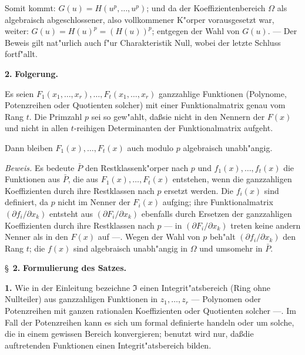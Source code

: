 Somit kommt: $G(u) = H(u^p,\ldots,u^p)$; und da der Koeffizientenbereich $\Omega$ als algebraisch abgeschlossener, also vollkommener K"orper vorausgesetzt war, weiter: $G(u) = H(u)^p = (H(u))^p$; entgegen der Wahl von $G(u)$. --- Der Beweis gilt nat"urlich auch f"ur Charakteristik Null, wobei der letzte Schluss fortf"allt.

\medskip\noindent\textbf{2.} \textbf{Folgerung.}

Es seien $F_1(x_1,\ldots,x_r),\ldots,F_t(x_1,\ldots,x_r)$ ganzzahlige Funktionen (Polynome, Potenzreihen oder Quotienten solcher) mit einer Funktionalmatrix genau vom Rang $t$. Die Primzahl $p$ sei so gew"ahlt, da\ss sie nicht in den Nennern der $F(x)$ und nicht in allen $t$-reihigen Determinanten der Funktionalmatrix aufgeht.

Dann bleiben $F_1(x),\ldots,F_t(x)$ auch modulo $p$ algebraisch unabh"angig.

\noindent\textit{Beweis.}
Es bedeute $\bar{P}$ den Restklassenk"orper nach $p$ und $f_1(x),\ldots,f_t(x)$ die Funktionen aus $\bar{P}$, die aus $F_1(x),\ldots,F_t(x)$ entstehen, wenn die ganzzahligen Koeffizienten durch ihre Restklassen nach $p$ ersetzt werden. Die $f_i(x)$ sind definiert, da $p$ nicht im Nenner der $F_i(x)$ aufging; ihre Funktionalmatrix $(\partial f_i/\partial x_k)$ entsteht aus $(\partial F_i/\partial x_k)$ ebenfalls durch Ersetzen der ganzzahligen Koeffizienten durch ihre Restklassen nach $p$ --- in $(\partial F_i/\partial x_k)$ treten keine andern Nenner als in den $F(x)$ auf ---. Wegen der Wahl von $p$ beh"alt $(\partial f_i/\partial x_k)$ den Rang $t$; die $f(x)$ sind algebraisch unabh"angig in $\Omega$ und umsomehr in $\bar{P}$.

\newpage
\S~\textbf{2.}
\textbf{Formulierung des Satzes.}

\smallskip

\noindent\textbf{1.}
Wie in der Einleitung bezeichne $\mathfrak{I}$ einen Integrit"atsbereich (Ring ohne Nullteiler) aus ganzzahligen Funktionen in $z_1,\ldots,z_r$ --- Polynomen oder Potenzreihen mit ganzen rationalen Koeffizienten oder Quotienten solcher ---. Im Fall der Potenzreihen kann es sich um formal definierte handeln oder um solche, die in einem gewissen Bereich konvergieren; benutzt wird nur, da\ss die auftretenden Funktionen einen Integrit"atsbereich bilden.

